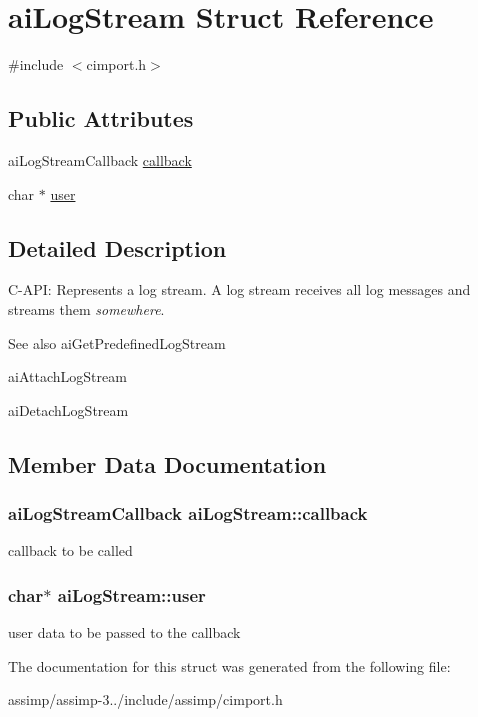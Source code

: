 \hypertarget{structai_log_stream}{\section{ai\+Log\+Stream Struct Reference}
\label{structai_log_stream}
}


{\ttfamily \#include $<$cimport.\+h$>$}

\subsection*{Public Attributes}
\begin{DoxyCompactItemize}
\item 
ai\+Log\+Stream\+Callback \hyperlink{structai_log_stream_ac73ae46eee54ba0f920d6abb97c33e97}{callback}
\item 
char $\ast$ \hyperlink{structai_log_stream_a3382042e4171a6dd5a71d7f98741f86e}{user}
\end{DoxyCompactItemize}


\subsection{Detailed Description}
C-\/\+A\+P\+I\+: Represents a log stream. A log stream receives all log messages and streams them {\itshape somewhere}. \begin{DoxySeeAlso}{See also}
ai\+Get\+Predefined\+Log\+Stream 

ai\+Attach\+Log\+Stream 

ai\+Detach\+Log\+Stream 
\end{DoxySeeAlso}


\subsection{Member Data Documentation}
\hypertarget{structai_log_stream_ac73ae46eee54ba0f920d6abb97c33e97}{
\subsubsection[{callback}]{\setlength{\rightskip}{0pt plus 5cm}ai\+Log\+Stream\+Callback ai\+Log\+Stream\+::callback}}\label{structai_log_stream_ac73ae46eee54ba0f920d6abb97c33e97}
callback to be called \hypertarget{structai_log_stream_a3382042e4171a6dd5a71d7f98741f86e}{
\subsubsection[{user}]{\setlength{\rightskip}{0pt plus 5cm}char$\ast$ ai\+Log\+Stream\+::user}}\label{structai_log_stream_a3382042e4171a6dd5a71d7f98741f86e}
user data to be passed to the callback 

The documentation for this struct was generated from the following file\+:\begin{DoxyCompactItemize}
\item 
assimp/assimp-\/3../include/assimp/cimport.\+h\end{DoxyCompactItemize}
